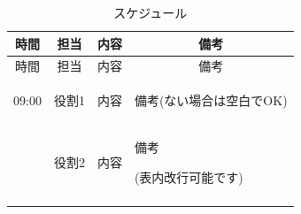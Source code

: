 \begin{longtable}[c]{|p{}|p{}|p{}|p{}|}
  \caption{スケジュール} \\
  \hline
  \multicolumn{1}{|c|}{時間} & \multicolumn{1}{c|}{担当} & \multicolumn{1}{c|}{内容} & \multicolumn{1}{c|}{備考} \\
  \hline
  \endfirsthead
  
  \hline
  \multicolumn{1}{|c|}{時間} & \multicolumn{1}{c|}{担当} & \multicolumn{1}{c|}{内容} & \multicolumn{1}{c|}{備考} \\
  \hline
  \endhead
  
  \hline
  \endfoot
  
  \hline
  \endlastfoot
  
  \begin{tpacol}
    09:00
  \end{tpacol}&
  \begin{tpbcol}
    役割1
  \end{tpbcol}&
  \begin{tpccol}
    内容
  \end{tpccol}&
  \begin{tpdcol}
    備考(ない場合は空白でOK)
  \end{tpdcol}\\

  \begin{tpacol}
    
  \end{tpacol}&
  \begin{tpbcol}
    役割2
  \end{tpbcol}&
  \begin{tpccol}
    内容
  \end{tpccol}&
  \begin{tpdcol}
    備考 \par
    (表内改行可能です)
  \end{tpdcol}\\

  \begin{tpacol}
    
  \end{tpacol}&
  \begin{tpbcol}
    
  \end{tpbcol}&
  \begin{tpccol}
    
  \end{tpccol}&
  \begin{tpdcol}
    
  \end{tpdcol}\\


\end{longtable}
\normalsize

